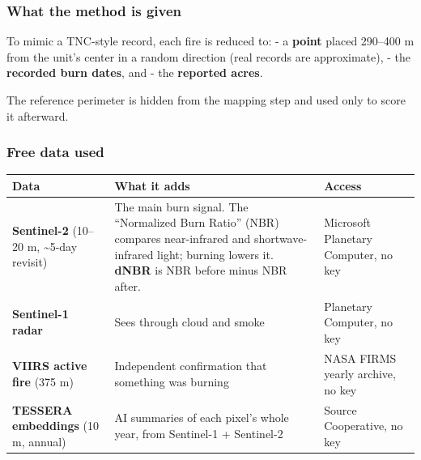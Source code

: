 \documentclass[
]{article}
\begin{document}
\subsubsection{What the method is given}\label{what-the-method-is-given}

To mimic a TNC-style record, each fire is reduced to: - a \textbf{point}
placed 290--400 m from the unit's center in a random direction (real
records are approximate), - the \textbf{recorded burn dates}, and - the
\textbf{reported acres}.

The reference perimeter is hidden from the mapping step and used only to
score it afterward.

\subsubsection{Free data used}\label{free-data-used}

\begin{longtable}[]{@{}
  >{\raggedright\arraybackslash}p{}
  >{\raggedright\arraybackslash}p{}
  >{\raggedright\arraybackslash}p{}@{}}
\toprule\noalign{}
\begin{minipage}[b]{\linewidth}\raggedright
Data
\end{minipage} & \begin{minipage}[b]{\linewidth}\raggedright
What it adds
\end{minipage} & \begin{minipage}[b]{\linewidth}\raggedright
Access
\end{minipage} \\
\midrule\noalign{}
\endhead
\bottomrule\noalign{}
\endlastfoot
\textbf{Sentinel-2} (10--20 m, \textasciitilde5-day revisit) & The main
burn signal. The ``Normalized Burn Ratio'' (NBR) compares near-infrared
and shortwave-infrared light; burning lowers it. \textbf{dNBR} is NBR
before minus NBR after. & Microsoft Planetary Computer, no key \\
\textbf{Sentinel-1 radar} & Sees through cloud and smoke & Planetary
Computer, no key \\
\textbf{VIIRS active fire} (375 m) & Independent confirmation that
something was burning & NASA FIRMS yearly archive, no key \\
\textbf{TESSERA embeddings} (10 m, annual) & AI summaries of each
pixel's whole year, from Sentinel-1 + Sentinel-2 & Source Cooperative,
no key \\
\end{longtable}
\end{document}
